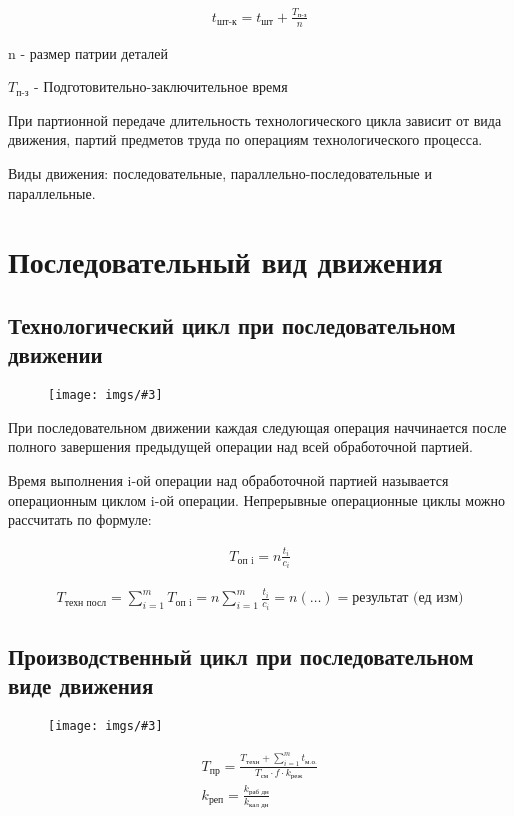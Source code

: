 \documentclass[14pt,a4paper,oneside]{extarticle}
\newcommand{\pic}[3]{
	\begin{figure}[#1]
		\begin{center}
			\texttt{[image: imgs/\#3]}
		\end{center}
	\end{figure}
}
\begin{document}
\begin{gather*}
    t_\text{шт-к}=t_\text{шт}+\frac{T_\text{п-з}}{n}
\end{gather*}

n - размер патрии деталей

$T_\text{п-з}$ - Подготовительно-заключительное время

При партионной передаче длительность технологического цикла зависит от вида движения, партий предметов труда по операциям технологического процесса.

Виды движения: последовательные, параллельно-последовательные и параллельные.

\section{Последовательный вид движения}

\subsection{Технологический цикл при последовательном движении}

\pic{H}{\textwidth}{2}

При последовательном движении каждая следующая операция наччинается после полного завершения предыдущей операции над всей обработочной партией.

Время выполнения i-ой операции над обработочной партией называется операционным циклом i-ой операции. Непрерывные операционные циклы можно рассчитать по формуле:

\begin{gather*}
    T_\text{оп i}=n\frac{t_i}{c_i}
\end{gather*}

\begin{gather*}
    T_\text{техн посл}=\sum_{i=1}^{m}T_\text{оп i}=n\sum_{i=1}^{m}\frac{t_i}{c_i}=n(\ldots)=\text{результат (ед изм)}
\end{gather*}

\subsection{Производственный цикл при последовательном виде движения}

\pic{H}{\textwidth}{3}

\begin{gather*}
    T_\text{пр}=\frac{T_\text{техн}+\sum_{i=1}^{m}t_\text{м.о.}}{T_\text{см}\cdot f\cdot k_\text{реж}}\\
    k_\text{реп}=\frac{k_\text{раб дн}}{k_\text{кал дн}}
\end{gather*}
\end{document}
